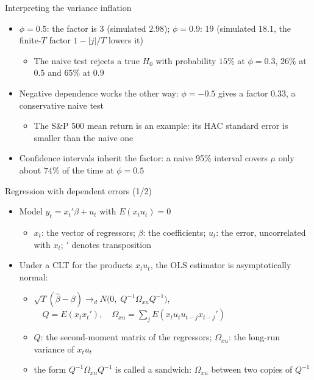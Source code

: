 \begin{frame}{Interpreting the variance inflation}
\itemsize{\small}
\begin{itemize}
    \item $\phi = 0.5$: the factor is $3$ (simulated $2.98$); $\phi = 0.9$: $19$ (simulated $18.1$, the finite-$T$ factor $1 - |j|/T$ lowers it)
    \begin{itemize}
        \item The naive test rejects a true $H_0$ with probability $15\%$ at $\phi = 0.3$, $26\%$ at $0.5$ and $65\%$ at $0.9$
    \end{itemize}
    \item Negative dependence works the other way: $\phi = -0.5$ gives a factor $0.33$, a conservative naive test
    \begin{itemize}
        \item The S\&P 500 mean return is an example: its HAC standard error is smaller than the naive one
    \end{itemize}
    \item Confidence intervals inherit the factor: a naive 95\% interval covers $\mu$ only about $74\%$ of the time at $\phi = 0.5$
\end{itemize}
\end{frame}

\begin{frame}{Regression with dependent errors (1/2)}
\itemsize{\small}
\begin{itemize}
    \item Model $y_t = x_t'\beta + u_t$ with $E(x_t u_t) = 0$
    \begin{itemize}
        \item $x_t$: the vector of regressors; $\beta$: the coefficients; $u_t$: the error, uncorrelated with $x_t$; $'$ denotes transposition
    \end{itemize}
    \item Under a CLT for the products $x_t u_t$, the OLS estimator is asymptotically normal:
    \begin{itemize}
        \item $\sqrt{T}(\hat\beta - \beta) \to_d N\big(0,\; Q^{-1}\Omega_{xu} Q^{-1}\big)$, $\quad Q = E(x_t x_t'),\quad \Omega_{xu} = \sum_{j}E(x_t u_t u_{t-j} x_{t-j}')$
        \item $Q$: the second-moment matrix of the regressors; $\Omega_{xu}$: the long-run variance of $x_t u_t$
        \item the form $Q^{-1}\Omega_{xu}Q^{-1}$ is called a sandwich: $\Omega_{xu}$ between two copies of $Q^{-1}$
    \end{itemize}
\end{itemize}
\end{frame}

